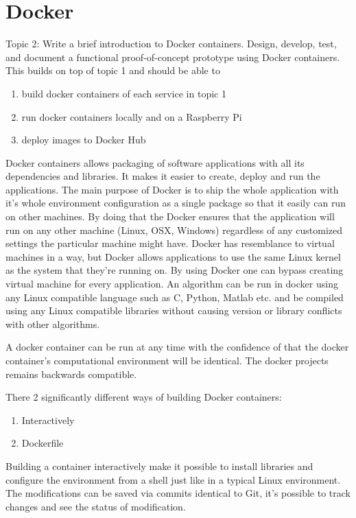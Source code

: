 \chapter{Docker}\label{ch:docker}
Topic 2: Write a brief introduction to Docker containers.  Design, develop, test, and document a functional proof-of-concept prototype using Docker containers. This builds on top of topic 1 and should be able to

\begin{enumerate}
\item build docker containers of each service in topic 1
\item run docker containers locally and on a Raspberry Pi
\item deploy images to Docker Hub
\end{enumerate} 

Docker containers allows packaging of software applications with all its dependencies and libraries. It makes it easier to create, deploy and run the applications. The main purpose of Docker is to ship the whole application with it's whole environment configuration as a single package so that it easily can run on other machines. 
By doing that the Docker ensures that the application will run on any other machine (Linux, OSX, Windows) regardless of any customized settings the particular machine might have.
Docker has resemblance to virtual machines in a way, but Docker allows applications to use the same Linux kernel as the system that they’re running on. By using Docker one can bypass creating virtual machine for every application. 
An algorithm can be run in docker using any Linux compatible language such as C, Python, Matlab etc. and be compiled using any Linux compatible libraries without causing version or library conflicts with other algorithms.

A docker container can be run at any time with the confidence of that the docker container’s computational environment will be identical. The docker projects remains backwards compatible. 


There 2 significantly different ways of building Docker containers:

\begin{enumerate}
	\item Interactively
	\item Dockerfile
\end{enumerate} 

Building a container interactively make it possible to install libraries and configure the environment from a shell just like in a typical Linux environment. The modifications can be saved via commits identical to Git, it’s possible to track changes and see the status of modification.  

